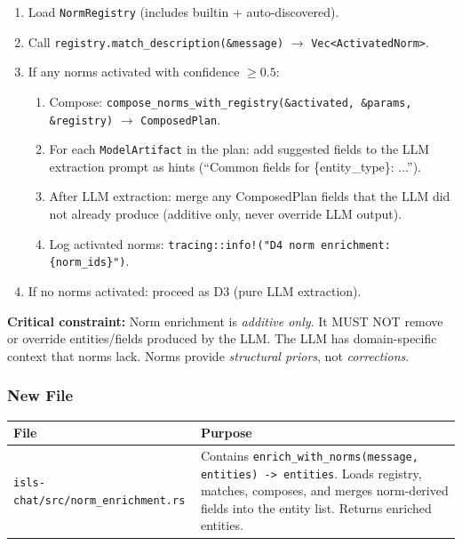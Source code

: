 \documentclass[11pt,a4paper]{article}
\begin{document}
\begin{enumerate}[nosep]
\item Load \texttt{NormRegistry} (includes builtin + auto-discovered).
\item Call \texttt{registry.match\_description(\&message)} $\to$ 
      \texttt{Vec<ActivatedNorm>}.
\item If any norms activated with confidence $\geq 0.5$:
      \begin{enumerate}[nosep,label=\alph*.]
      \item Compose: \texttt{compose\_norms\_with\_registry(\&activated, 
            \&params, \&registry)} $\to$ \texttt{ComposedPlan}.
      \item For each \texttt{ModelArtifact} in the plan: add suggested 
            fields to the LLM extraction prompt as hints 
            (``Common fields for \{entity\_type\}: ...'').
      \item After LLM extraction: merge any ComposedPlan fields that 
            the LLM did not already produce (additive only, never 
            override LLM output).
      \item Log activated norms: 
            \texttt{tracing::info!("D4 norm enrichment: \{norm\_ids\}")}.
      \end{enumerate}
\item If no norms activated: proceed as D3 (pure LLM extraction).
\end{enumerate}

\textbf{Critical constraint:} Norm enrichment is \emph{additive only}. 
It MUST NOT remove or override entities/fields produced by the LLM. 
The LLM has domain-specific context that norms lack. Norms provide 
\emph{structural priors}, not \emph{corrections}.

\subsubsection{New File}

\begin{longtable}{lp{10cm}}
\toprule
\textbf{File} & \textbf{Purpose} \\
\midrule
\texttt{isls-chat/src/norm\_enrichment.rs}
  & Contains \texttt{enrich\_with\_norms(message, entities) -> entities}. 
    Loads registry, matches, composes, and merges norm-derived fields 
    into the entity list. Returns enriched entities. \\
\bottomrule
\end{longtable}
\end{document}
